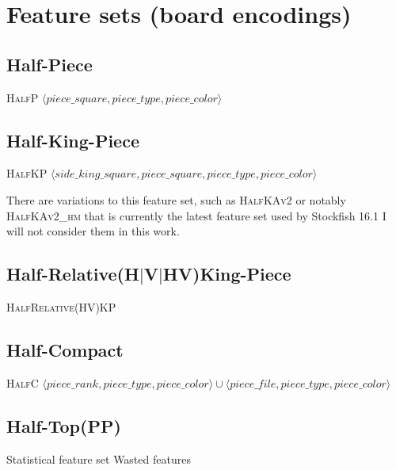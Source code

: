 \newcommand{\fs}[1]{\textsc{#1}}

\section{Feature sets (board encodings)}

\subsection{Half-Piece}

\fs{HalfP}
$\langle piece\_square, piece\_type, piece\_color \rangle$

\subsection{Half-King-Piece}

\fs{HalfKP}
$\langle side\_king\_square, piece\_square, piece\_type, piece\_color \rangle$

There are variations to this feature set, such as \fs{HalfKAv2} or notably \fs{HalfKAv2\_hm} that is currently the latest feature set used by Stockfish 16.1 I will not consider them in this work.

\subsection{Half-Relative(H$|$V$|$HV)King-Piece}

\fs{HalfRelative(HV)KP}

\subsection{Half-Compact}

\fs{HalfC}
$\langle piece\_rank, piece\_type, piece\_color \rangle \cup \langle piece\_file, piece\_type, piece\_color \rangle$

\subsection{Half-Top(PP)}

Statistical feature set
Wasted features


